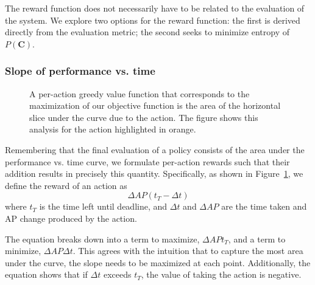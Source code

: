\documentclass[runningheads]{llncs}
\begin{document}
The reward function does not necessarily have to be related to the evaluation of the system.
We explore two options for the reward function: the first is derived directly from the evaluation metric; the second seeks to minimize entropy of $P(\mathbf{C})$.

\subsubsection{Slope of performance vs. time}
\begin{figure}[htb]
  \caption{\label{fig:rewards}A per-action greedy value function that corresponds to the maximization of our objective function is the area of the horizontal slice under the curve due to the action. The figure shows this analysis for the action highlighted in orange.}
\end{figure}

Remembering that the final evaluation of a policy consists of the area under the performance vs. time curve, we formulate per-action rewards such that their addition results in precisely this quantity.
Specifically, as shown in Figure~\ref{fig:rewards}, we define the reward of an action as
\begin{equation}\label{eq:advanced}
\Delta AP (t_T-\Delta t)
\end{equation}
where $t_T$ is the time left until deadline, and $\Delta t$ and $\Delta AP$ are the time taken and AP change produced by the action.

The equation breaks down into a term to maximize, $\Delta AP t_T$, and a term to minimize, $\Delta AP \Delta t$.
This agrees with the intuition that to capture the most area under the curve, the slope needs to be maximized at each point.
Additionally, the equation shows that if $\Delta t$ exceeds $t_T$, the value of taking the action is negative.
\end{document}
